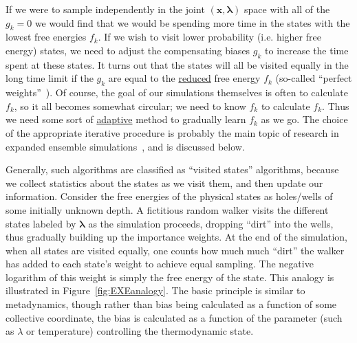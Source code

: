 \documentclass[9pt,review]{livecoms}
\newcommand{\vx}{\mathbf{x}}
\begin{document}
If we were to sample independently in the joint $(\vx,\mathbf{\lambda})$ space with all of the $g_k=0$
we would find that we would be spending more time in the states with the lowest free energies $f_k$.  If we wish to visit
  lower probability (i.e. higher free energy) states, we need to adjust the compensating biases $g_k$ to increase the time spent at these states. It turns out that the states will all be visited equally in the long time limit if the $g_k$ are equal to the \hyperlink{ref:reduced} {reduced} free
    energy $f_k$ (so-called ``perfect weights''~\cite{park-pande:pre:2007:choosing-weights-simulated-tempering}).
    Of course, the goal of our simulations
    themselves is often to calculate $f_k$, so it all
    becomes somewhat circular; we need to know $f_k$ to calculate $f_k$.
    Thus we need some sort of \hyperlink{ref:Adaptive} {adaptive} method to gradually learn $f_k$
    as we go. The choice of the appropriate iterative procedure is probably the main topic of research in expanded ensemble simulations~\cite{lyubartsev:jcp:1992:expanded-ensembles,marinari-parisi:europhys-lett:1992:simulated-tempering,wang-landau:prl:2001:wang-landau,park-ensign-pande:pre:2006:bayesian-weight-update,park-pande:pre:2007:choosing-weights-simulated-tempering,li-fajer-yang:jcp:2007:simulated-scaling,chelli:jctc:2010:optimal-weights-expanded-ensembles}, and is discussed below.

Generally, such algorithms are classified as ``visited states''
algorithms, because we collect statistics about the states as we visit
them, and then update our information. Consider the free energies of
the physical states as holes/wells of some initially unknown depth.  A
fictitious random walker visits the different states labeled by
$\mathbf{\lambda}$ as the simulation proceeds, dropping ``dirt'' into the
wells, thus gradually building up the importance weights.  At the end
of the simulation, when all states are visited equally, one counts how
much much ``dirt'' the walker has added to each state's weight to
achieve equal sampling. The negative logarithm of this weight is simply
the free energy of the state.  This analogy is illustrated in
Figure~\ref{fig:EXEanalogy}. The basic principle is similar to metadynamics, though rather than bias being calculated as a function of some collective coordinate, the bias is calculated as a function of the parameter (such as $\lambda$ or temperature) controlling the thermodynamic state.
\end{document}
